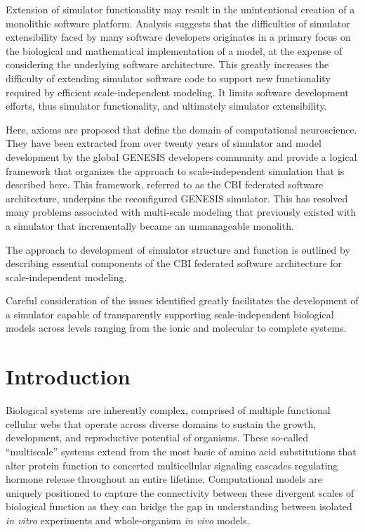 \documentclass{article}
\begin{document}
Extension of simulator functionality may result in the unintentional creation of a monolithic software platform.  Analysis suggests that the difficulties of simulator extensibility faced by many software developers originates in a primary focus on the biological and mathematical implementation of a model, at the expense of considering the underlying software architecture. This greatly increases the difficulty of extending simulator software code to support new functionality required by efficient scale-independent modeling.  It limits software development efforts, thus simulator functionality, and ultimately simulator extensibility. 

Here, axioms are proposed that define the domain of computational neuroscience. They have been extracted from over twenty years of simulator and model development by the global GENESIS developers community and provide a logical framework that organizes the approach to scale-independent simulation that is described here. This framework, referred to as the CBI federated software architecture, underpins the reconfigured GENESIS simulator.  This has resolved many problems associated with multi-scale modeling that previously existed with a simulator that incrementally became an unmanageable monolith.  

The approach to development of simulator structure and function is outlined by describing essential components of the CBI federated software architecture for scale-independent modeling.

Careful consideration of the issues identified greatly facilitates the development of a simulator capable of transparently supporting scale-independent biological models across levels ranging from the ionic and molecular to complete systems.


\section{Introduction}

Biological systems are inherently complex, comprised of multiple functional cellular webs that operate across diverse domains to sustain the growth, development, and reproductive potential of organisms. These so-called “multiscale” systems extend from the most basic of amino acid substitutions that alter protein function to concerted multicellular signaling cascades regulating hormone release throughout an entire lifetime. Computational models are uniquely positioned to capture the connectivity between these divergent scales of biological function as they can bridge the gap in understanding between isolated \textit{in vitro} experiments and whole-organism \textit{in vivo} models.
\end{document}
